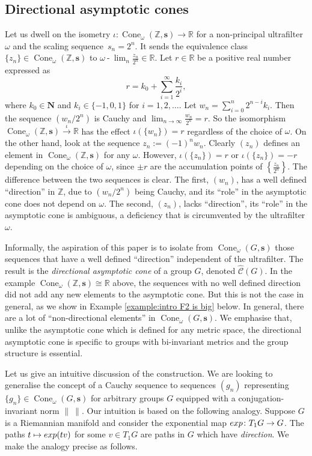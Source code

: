 \documentclass[12pt]{amsart}
\theoremstyle{definition}
\def\RR{\ensuremath{\mathbb{R}}}
\def\ZZ{\ensuremath{\mathbb{Z}}}
\newcommand{\B}[1]{\mathbf{#1}}
\newcommand{\xto}[1]{\xrightarrow{#1}}
\newcommand{\OP}[1]{\operatorname{#1}}
\def\omegalim{\omega\operatorname{-}\lim}
\def\Cone{\OP{Cone}}
\def\tC{\hat{\mathcal{C}}}
\begin{document}
\subsection{Directional asymptotic cones}
Let us dwell on the isometry $\iota \colon \Cone_\omega(\ZZ,\B s) \to
\RR$ for a non-principal ultrafilter $\omega$ and the scaling
sequence~$s_n=2^n$.  It sends the equivalence class $\{ z_n\} \in
\Cone_\omega(\ZZ,\B s)$ to $\omegalim_n \tfrac{z_n}{2^n} \in \RR$.
Let $r\in \RR$ be a positive real number expressed as
\begin{equation}
r = k_0 + \sum_{i=1}^{\infty} \frac{k_i}{2^i},
\label{Eq:cauchy-r}
\end{equation}
where $k_0\in \B N$ and $k_i \in \{-1,0,1\}$ for $i=1,2,\ldots$.
Let $w_n = \sum_{i=0}^{n} 2^{n-i}k_i$.
Then the sequence $(w_n/2^n)$ is Cauchy and $\lim_{n \to \infty} \tfrac{w_n}{2^n} = r$.
So the isomorphism $\Cone_\omega(\ZZ,\B s) \xto{\iota} \RR$ has the effect  $\iota(\{w_n\})=r$ regardless of the choice of $\omega$.
On the other hand, look at the sequence $z_n := (-1)^n w_n$.
Clearly 
$(z_n)$ defines an element in $\Cone_\omega(\ZZ,\B s)$ for any $\omega$.
However, $\iota(\{z_n\})=r$ or $\iota(\{z_n\})=-r$ depending on the choice of $\omega$, since $\pm r$ are the accumulation points of $\left\{ \tfrac{z_n}{2^n}\right\}$.
The difference between the two sequences is clear.
The first, $(w_n)$,  has a well defined ``direction'' in $\ZZ$,
due to $(w_n/2^n)$ being Cauchy,
and its ``role'' in the asymptotic cone does not depend on $\omega$.
The second, $(z_n)$, lacks ``direction'', its ``role'' in the asymptotic cone is ambiguous, a deficiency that is circumvented by the ultrafilter $\omega$.

Informally, the aspiration of this paper is to isolate from $\Cone_\omega(G,\B
s)$ those sequences that have a well defined ``direction'' independent of the
ultrafilter.  The result is the  {\em directional asymptotic cone} of a group
$G$, denoted $\tC(G)$.  In the example $\Cone_\omega(\ZZ,\B s) \cong \RR$
above, the sequences with no well defined direction did not add any new
elements to the asymptotic cone.  But this is not the case in general, as we
show in Example \ref{example:intro F2 is big} below.  In general, there are a
lot of ``non-directional elements'' in $\Cone_\omega(G,\B s)$.
We emphasise that, unlike the  asymptotic cone which is defined for any metric space, the directional asymptotic cone is specific to groups with bi-invariant metrics
and the group structure is essential.

Let us give an intuitive discussion of the construction.
We are looking to generalise the concept of a Cauchy sequence to sequences $(g_n)$ representing $\{g_n\} \in \Cone_\omega(G,\B s)$ for arbitrary groups $G$ equipped with a conjugation-invariant norm $\| \ \|$.
Our intuition is based on the following analogy. Suppose $G$ is a 
Riemannian manifold and consider the exponential map ${\rm exp}\colon T_1G\to G$.
The paths $t\mapsto {\rm exp}(tv)$ for some $v\in T_1G$ are paths in $G$
which have {\it direction}. We make the analogy precise as follows.
\end{document}

